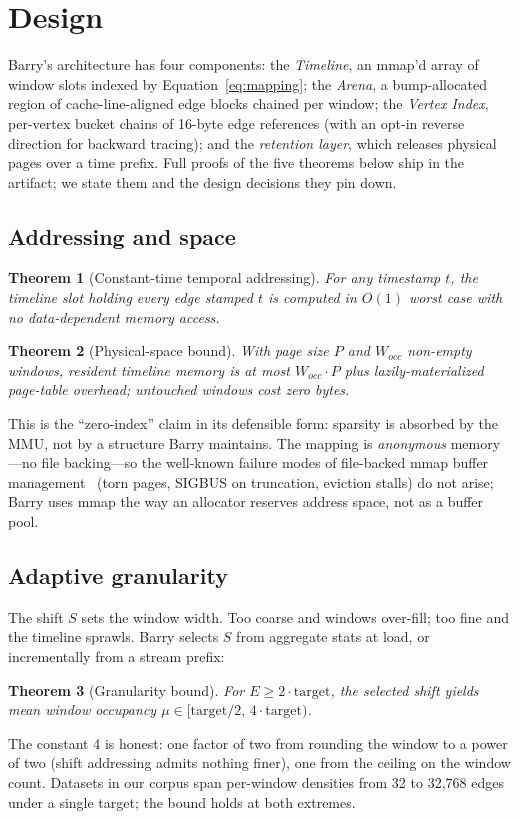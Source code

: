 \documentclass[11pt,letterpaper,twocolumn]{article}
\newtheorem{theorem}{Theorem}
\begin{document}
\section{Design}
\label{sec:design}

Barry's architecture has four components: the \emph{Timeline}, an
mmap'd array of window slots indexed by
Equation~\eqref{eq:mapping}; the \emph{Arena}, a bump-allocated
region of cache-line-aligned edge blocks chained per window; the
\emph{Vertex Index}, per-vertex bucket chains of 16-byte edge
references (with an opt-in reverse direction for backward tracing);
and the \emph{retention layer}, which releases physical pages over a
time prefix. Full proofs of the five theorems below ship in the
artifact; we state them and the design decisions they pin down.

\subsection{Addressing and space}
\begin{theorem}[Constant-time temporal addressing]
\label{thm:addr}
For any timestamp $t$, the timeline slot holding every edge stamped
$t$ is computed in $O(1)$ worst case with no data-dependent memory
access.
\end{theorem}
\begin{theorem}[Physical-space bound]
\label{thm:space}
With page size $P$ and $W_{occ}$ non-empty windows, resident timeline
memory is at most $W_{occ}\cdot P$ plus lazily-materialized page-table
overhead; untouched windows cost zero bytes.
\end{theorem}
This is the ``zero-index'' claim in its defensible form: sparsity is
absorbed by the MMU, not by a structure Barry maintains. The mapping
is \emph{anonymous} memory---no file backing---so the well-known
failure modes of file-backed mmap buffer
management~\cite{crotty2022mmap} (torn pages, SIGBUS on truncation,
eviction stalls) do not arise; Barry uses mmap the way an allocator
reserves address space, not as a buffer pool.

\subsection{Adaptive granularity}
The shift $S$ sets the window width. Too coarse and windows over-fill;
too fine and the timeline sprawls. Barry selects $S$ from aggregate
stats at load, or incrementally from a stream prefix:
\begin{theorem}[Granularity bound]
\label{thm:shift}
For $E \ge 2\cdot\mathrm{target}$, the selected shift yields mean
window occupancy $\mu \in [\mathrm{target}/2,\, 4\cdot\mathrm{target})$.
\end{theorem}
The constant 4 is honest: one factor of two from rounding the window
to a power of two (shift addressing admits nothing finer), one from
the ceiling on the window count. Datasets in our corpus span
per-window densities from 32 to 32{,}768 edges under a single target;
the bound holds at both extremes.
\end{document}
